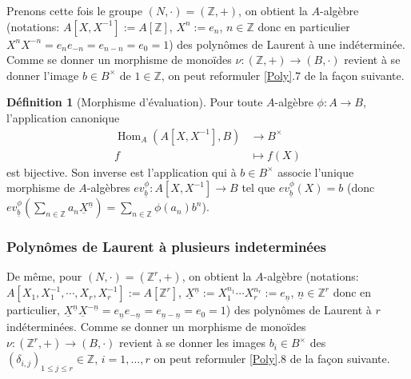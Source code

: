\documentclass[a4paper, oneside, 12pt]{book}
\theoremstyle{theoremeStyle} %
\theoremstyle{definition} %
\newtheorem{definition}[theoreme]{Définition}
\DeclareMathOperator{\SHom}{Hom}
\newcommand{\Z}{\mathbb{Z}}
\begin{document}
  Prenons cette fois le groupe $(N,\cdot)=(\Z,+)$, on obtient la $A$-algèbre (notations:  $A[X,X^{-1}]:=A[\Z]$, $X^n:=e_n$, $n\in \Z$ donc en particulier $X^nX^{-n}=e_ne_{-n}=e_{n-n}=e_0=1$) des polynômes de Laurent à une indéterminée. Comme se donner    un morphisme de monoïdes $\nu:(\Z,+)\rightarrow (B ,\cdot)$ revient à se donner l'image  $b \in B^\times $ de $1\in \Z$, on peut reformuler \ref{Poly}.7 de la façon suivante.\\

\begin{definition}[Morphisme d'évaluation]Pour toute $A$-algèbre $\phi:A\rightarrow B$,  l'application canonique
\begin{align*}\SHom_A(A[X,X^{-1}],B) &\to B^\times \\ f&\mapsto f(X)\end{align*}
est bijective. Son inverse est l'application qui à $b \in B^\times$ associe l'unique morphisme de $A$-algèbres $ev_{\underline{b}}^\phi:A[X,X^{-1}]\rightarrow B$ tel que $ev_{\underline{b}}^\phi(X)=b$ (donc $ev_{\underline{b}}^\phi(\sum_{n\in \Z}a_n\underline{X}^{\underline{n}})=\sum_{n\in \Z}\phi(a_n)b^n$).\end{definition}

  \subsubsection{Polynômes de Laurent à plusieurs indeterminées}
  
  De même, pour $(N,\cdot)=(\Z^r,+)$, on obtient la $A$-algèbre (notations:  $A[X_1,X_1^{-1},\cdots, X_r,X_r^{-1}]:=A[\Z^r]$, $\underline{X}^{\underline{n}}:=X_1^{n_1}\cdots X_r^{n_r}:=e_{\underline{n}}$, $\underline{n}\in \Z^r$ donc en particulier, $\underline{X}^{\underline{n}}\underline{X}^{-\underline{n}}= e_{\underline{n}}e_{-\underline{n}}=e_{\underline{n}-\underline{n}}=e_0=1$) des polynômes de Laurent à $r$ indéterminées. Comme se donner    un morphisme de monoïdes $\nu:(\Z^r,+)\rightarrow (B ,\cdot)$ revient à se donner les images $b_i \in B^\times $ des $(\delta_{i,j})_{1\leq j\leq r}\in \Z$, $i=1,\dots, r$ on peut reformuler \ref{Poly}.8 de la façon suivante.
\end{document}
